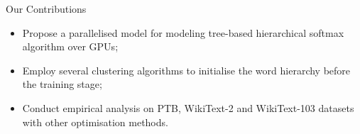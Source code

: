 \documentclass[final,t,unknownkeysallowed]{beamer}
\begin{document}
\begin{frame}{}
\begin{columns}[t]
\begin{column}{.3\linewidth}
      \begin{block}{Our Contributions}
	\begin{itemize}
	\item Propose a parallelised model for modeling tree-based hierarchical softmax algorithm over GPUs;
    \item Employ several clustering algorithms to initialise the word hierarchy before the training stage;
    \item Conduct empirical analysis on PTB, WikiText-2 and WikiText-103 datasets with other optimisation methods.
	\end{itemize}
      \end{block}
    \end{column}
  \end{columns}
\end{frame}
\end{document}
